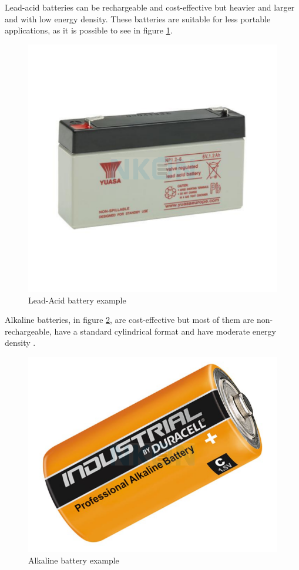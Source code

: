 Lead-acid batteries can be rechargeable and cost-effective but heavier and larger and with low energy density.
These batteries are suitable for less portable applications, \cite{BATT3} as it is possible to see in figure \ref{fig:lead}.
\begin{figure}[H]
    \centering
    \includegraphics[scale=0.4]{ch4/assets/lead.png}
    \caption{Lead-Acid battery example \cite{lead}}
    \label{fig:lead}
\end{figure}

Alkaline batteries, in figure \ref{fig:alkaline}, are cost-effective but most of them are non-rechargeable, have a standard cylindrical format and have moderate energy density \cite{BATT3}.
\begin{figure}[H]
    \centering
    \includegraphics[scale=0.3]{ch4/assets/alkaline.png}
    \caption{Alkaline battery example \cite{alkaline}}
    \label{fig:alkaline}
\end{figure}

